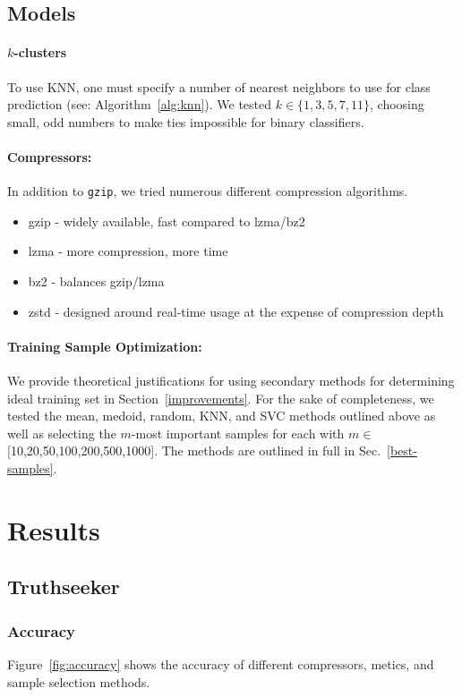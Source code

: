 \documentclass[sigconf]{acmart}
\begin{document}
\subsection{Models}

\paragraph{$k$-clusters}
To use KNN, one must specify a number of nearest neighbors to use for class prediction (see: Algorithm~\ref{alg:knn}). We tested $k \in \{1,3,5,7,11\}$, choosing small, odd numbers to make ties impossible for binary classifiers.
\paragraph{Compressors:} In addition to \texttt{gzip}, we tried numerous different compression algorithms. 
\begin{itemize}
    \item gzip - widely available, fast compared to lzma/bz2
    \item lzma - more compression, more time
    \item bz2 - balances gzip/lzma
    \item zstd - designed around real-time usage at the expense of compression depth
\end{itemize}

\paragraph{Training Sample Optimization:}
\label{methods}
We provide theoretical justifications for using secondary methods for determining ideal training set in Section~\ref{improvements}. For the sake of completeness, we tested the mean, medoid, random, KNN, and SVC methods outlined above as well as selecting the $m$-most important samples for each with $m \in$ [10,20,50,100,200,500,1000]. The methods are outlined in full in Sec.~\ref{best-samples}.


\section{Results}

\subsection{Truthseeker}

\subsubsection{Accuracy}
Figure~\ref{fig:accuracy} shows the accuracy of different compressors, metics, and sample selection methods.
\end{document}
